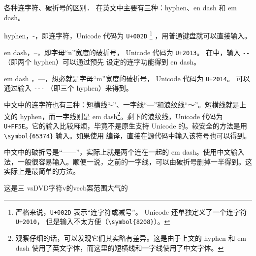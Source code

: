 \begin{myQA}{各种连字符、破折号的区别．}
	在英文中主要有三种：hyphen、en dash 和 em dash。
	
	\begin{myItemize}
		\item  hyphen，-，即连字符，Unicode 代码为 \verb|U+002D|
			\footnote{严格来说，\verb|U+002D| 表示“连字符或减号”。
				Unicode 还单独定义了一个连字符 \verb|U+2010|，
				但是输入不太方便（\verb|\symbol{8208}|）。}
			，用普通键盘就可以直接输入。
		\item en dash，--，即字母“n”宽度的破折号，
			Unicode 代码为 \verb|U+2013|。
			在\LaTeXTeX 中，输入 \verb|--| （即两个 hyphen）可以通过预先
			设定的连字功能得到 en dash。
		\item em dash ，---，想必就是字母“m”宽度的破折号，
			Unicode 代码为 \verb|U+2014|。
			可以通过输入 \verb|---| （即三个 hyphen）来得到。
	\end{myItemize}
	
	\blankline
	
	中文中的连字符也有三种：短横线“{\Songti -}”、一字线“—”和浪纹线“～”。短横线就是上文的 hyphen，而一字线则是 em dash\footnote{观察仔细的话，可以发现它们其实略有差异。这是由于上文的 hyphen 和 em dash 使用了英文字体，而这里的短横线和一字线使用了中文字体。}。剩下的浪纹线，Unicode 代码为 \verb|U+FF5E|。它的输入比较麻烦，毕竟\LaTeXTeX 不是原生支持 Unicode 的。较安全的方法是用 \verb|\symbol{65374}| 输入。如果使用  编译，直接在源代码中输入该符号也可以得到。
	
	中文中的破折号是“——”，实际上就是两个连在一起的 em dash。使用中文输入法，一般很容易输入。顺便一说，之前的一字线，可以由破折号删掉一半得到。这实际上是最简单的方法。
\end{myQA}

\begin{myQA}{这是三}
	vsDVD字符v的vecb案范围大气的
\end{myQA}